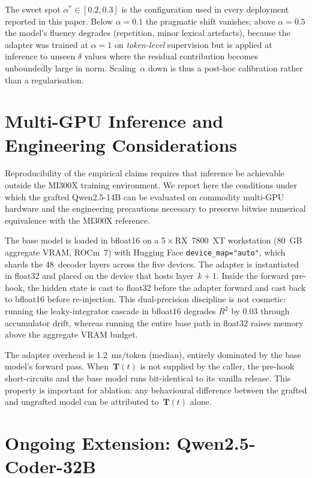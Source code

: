 \documentclass[10pt,twocolumn,letterpaper]{article}
\begin{document}
The sweet spot $\alpha^{*}\in[0.2,0.3]$ is the configuration used in every deployment reported in this paper. Below $\alpha\!=\!0.1$ the pragmatic shift vanishes; above $\alpha\!=\!0.5$ the model's fluency degrades (repetition, minor lexical artefacts), because the adapter was trained at $\alpha\!=\!1$ on \emph{token-level} supervision but is applied at inference to unseen $\delta$ values where the residual contribution becomes unboundedly large in norm. Scaling~$\alpha$ down is thus a post-hoc calibration rather than a regularisation.

\section{Multi-GPU Inference and Engineering Considerations}

Reproducibility of the empirical claims requires that inference be achievable outside the MI300X training environment. We report here the conditions under which the grafted Qwen2.5-14B can be evaluated on commodity multi-GPU hardware and the engineering precautions necessary to preserve bitwise numerical equivalence with the MI300X reference.

The base model is loaded in bfloat16 on a 5\,$\times$\,RX~7800~XT workstation (80~GB aggregate VRAM, ROCm~7) with Hugging Face \texttt{device\_map="auto"}, which shards the 48~decoder layers across the five devices. The adapter is instantiated in float32 and placed on the device that hosts layer~$k{+}1$. Inside the forward pre-hook, the hidden state is cast to float32 before the adapter forward and cast back to bfloat16 before re-injection. This dual-precision discipline is not cosmetic: running the leaky-integrator cascade in bfloat16 degrades $R^2$ by 0.03 through accumulator drift, whereas running the entire base path in float32 raises memory above the aggregate VRAM budget.

The adapter overhead is 1.2~ms/token (median), entirely dominated by the base model's forward pass. When~$\mathbf{T}(t)$ is not supplied by the caller, the pre-hook short-circuits and the base model runs bit-identical to its vanilla release. This property is important for ablation: any behavioural difference between the grafted and ungrafted model can be attributed to~$\mathbf{T}(t)$ alone.

\section{Ongoing Extension: Qwen2.5-Coder-32B}
\label{sec:extension}
\end{document}
